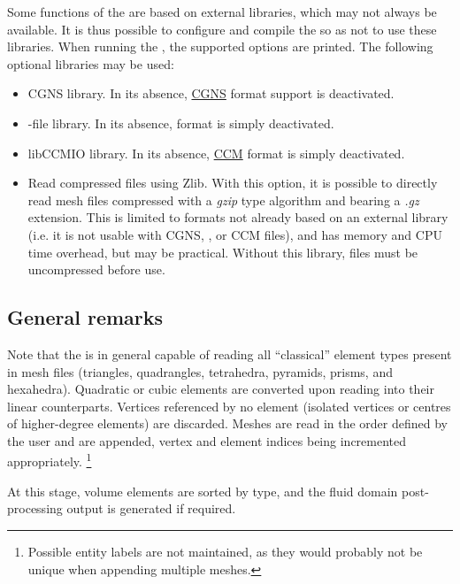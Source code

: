 {{{{Some functions of the \pcs are based on external libraries,
which may not always be available. It is thus possible to configure
and compile the \pcs so as not to use these libraries.
When running the \pcs, the supported options are printed.
The following optional libraries may be used:

\begin{itemize}

\item CGNS library. In its absence, \hyperref[sec:fmtdesc_cgns]{CGNS}
      format support is deactivated.

\item \med-file library. In its absence, \hyperref[sec:fmtdesc_med]{\med}
      format is simply deactivated.

\item libCCMIO library. In its absence, \hyperref[fmtdesc:ccm]{CCM}
      format is simply deactivated.

\item Read compressed files using Zlib. With this option, it is
      possible to directly read mesh files compressed with a
      \emph{gzip} type algorithm and bearing a \emph{.gz} extension.
      This is limited to formats not already based on an external
      library (i.e. it is not usable with CGNS, \med, or CCM files),
      and has memory and CPU time overhead, but may be practical.
      Without this library, files must be uncompressed before use.

\end{itemize}

\subsection{General remarks}

Note that the \pcs is in general capable of reading all ``classical''
element types present in mesh files (triangles, quadrangles, tetrahedra,
pyramids, prisms, and hexahedra).
Quadratic or cubic elements are converted upon reading into their
linear counterparts. Vertices referenced by no element (isolated vertices
or centres of higher-degree elements) are discarded. Meshes are read
in the order defined by the user and are appended, vertex and element
indices being incremented appropriately.
\footnote{Possible entity labels are not maintained, as they would
probably not be unique when appending multiple meshes.}

At this stage, volume elements are sorted by type, and the fluid domain
post-processing output is generated if required.

}}}}
